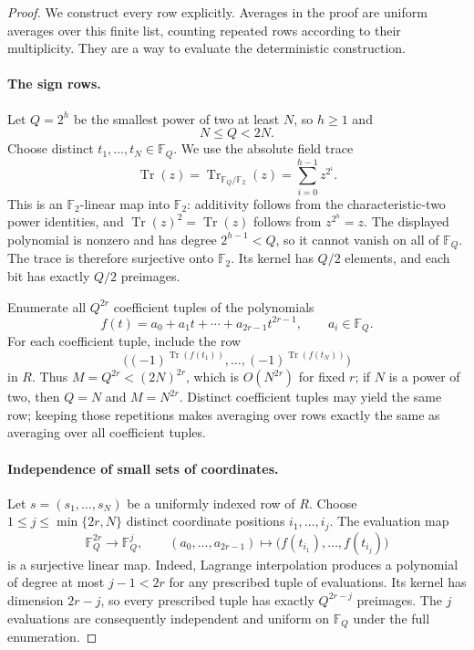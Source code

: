 \documentclass[11pt,letterpaper]{article}
\numberwithin{equation}{section}
\theoremstyle{definition}
\theoremstyle{remark}
\DeclareMathOperator{\Tr}{Tr}
\newcommand{\F}{\mathbb F}
\begin{document}
\begin{proof}
We construct every row explicitly. Averages in the proof are uniform averages over this finite list, counting repeated rows according to their multiplicity. They are a way to evaluate the deterministic construction.

\paragraph{The sign rows.}
Let $Q=2^h$ be the smallest power of two at least $N$, so $h\ge1$ and
\[
 N\le Q<2N.
\]
Choose distinct $t_1,\ldots,t_N\in\F_Q$. We use the absolute field trace
\[
 \Tr(z)=\Tr_{\F_Q/\F_2}(z)
       =\sum_{i=0}^{h-1}z^{2^i}.
\]
This is an $\F_2$-linear map into $\F_2$: additivity follows from the characteristic-two power identities, and $\Tr(z)^2=\Tr(z)$ follows from $z^{2^h}=z$. The displayed polynomial is nonzero and has degree $2^{h-1}<Q$, so it cannot vanish on all of $\F_Q$. The trace is therefore surjective onto $\F_2$. Its kernel has $Q/2$ elements, and each bit has exactly $Q/2$ preimages.

Enumerate all $Q^{2r}$ coefficient tuples of the polynomials
\[
 f(t)=a_0+a_1t+\cdots+a_{2r-1}t^{2r-1},
 \qquad a_i\in\F_Q.
\]
For each coefficient tuple, include the row
\begin{equation}\label{eq:sign-row}
 \bigl((-1)^{\Tr(f(t_1))},\ldots,(-1)^{\Tr(f(t_N))}\bigr)
\end{equation}
in $R$. Thus $M=Q^{2r}<(2N)^{2r}$, which is $O(N^{2r})$ for fixed $r$; if $N$ is a power of two, then $Q=N$ and $M=N^{2r}$. Distinct coefficient tuples may yield the same row; keeping those repetitions makes averaging over rows exactly the same as averaging over all coefficient tuples.

\paragraph{Independence of small sets of coordinates.}
Let $s=(s_1,\ldots,s_N)$ be a uniformly indexed row of $R$. Choose $1\le j\le\min\{2r,N\}$ distinct coordinate positions $i_1,\ldots,i_j$. The evaluation map
\[
 \F_Q^{2r}\longrightarrow\F_Q^j,
 \qquad(a_0,\ldots,a_{2r-1})
 \longmapsto\bigl(f(t_{i_1}),\ldots,f(t_{i_j})\bigr)
\]
is a surjective linear map. Indeed, Lagrange interpolation produces a polynomial of degree at most $j-1<2r$ for any prescribed tuple of evaluations. Its kernel has dimension $2r-j$, so every prescribed tuple has exactly $Q^{2r-j}$ preimages. The $j$ evaluations are consequently independent and uniform on $\F_Q$ under the full enumeration.


\end{proof}
\end{document}
